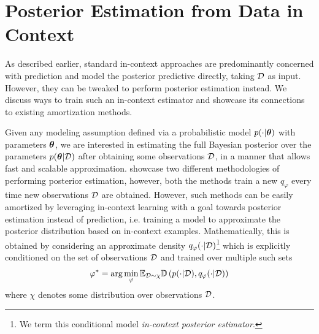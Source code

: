 \vspace{-3mm}
\section{Posterior Estimation from Data in Context}
\label{sec:method}
\vspace{-1mm}
As described earlier, standard in-context approaches are predominantly concerned with prediction and model the posterior predictive directly, taking ${\mathcal{D}}$ as input. However, they can be tweaked to perform posterior estimation instead. We discuss ways to train such an in-context estimator and showcase its connections to existing amortization methods.

Given any modeling assumption defined via a probabilistic model $p(\cdot | {\bm{\theta}})$ with parameters ${\bm{\theta}}$, we are interested in estimating the full Bayesian posterior over the parameters $p({\bm{\theta}} | {\mathcal{D}})$ after obtaining some observations ${\mathcal{D}}$, in a manner that allows fast and scalable approximation.  showcase two different methodologies of performing posterior estimation, however, both the methods train a new $q_\varphi$ every time new observations ${\mathcal{D}}$ are obtained. However, such methods can be easily amortized by leveraging in-context learning with a goal towards posterior estimation instead of prediction, i.e. training a model to approximate the posterior distribution based on in-context examples. Mathematically, this is obtained by considering an approximate density $q_\varphi(\cdot | {\mathcal{D}})$\footnote{We term this conditional model \emph{in-context posterior estimator}.} which is explicitly conditioned on the set of observations ${\mathcal{D}}$ and trained over multiple such sets
\begin{align}
    \varphi^* = \arg\min_\varphi \mathbb{E}_{{\mathcal{D}} \sim \chi} \mathbb{D}\left(p(\cdot | {\mathcal{D}}), q_\varphi(\cdot|{\mathcal{D}})\right)
\end{align}
where $\chi$ denotes some distribution over observations ${\mathcal{D}}$. 

